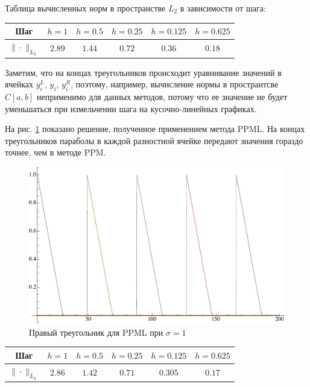 \documentclass[12pt,a4paper]{article}
\newcommand{\picref}[1]{рис. \ref{#1}}
\begin{document}
    Таблица вычисленных норм в пространстве $ L_2 $ в зависимости от шага:

    \begin{center}
        \begin{tabular}{ |c|c|c|c|c|c| } 
         \hline
         Шаг & $ h=1 $ &  $ h=0.5$ &  $ h=0.25 $ &  $ h=0.125 $ &  $ h=0.625 $ \\ 
         \hline
         $\| \cdot \|_{L_2}$ & $2.89$ & $1.44$ & $0.72$ & $0.36$ & $0.18$ \\
         \hline
        \end{tabular}
    \end{center}

    Заметим, что на концах треугольников происходит уравнивание значений в ячейках $ y_i^L,\, y_i,\, y_i^R $, поэтому, например, вычисление нормы в пространтсве $C[a,b]$ неприменимо для данных методов, потому что ее значение не будет уменьшаться при измельчении шага на кусочно-линейных графиках.

    \pagebreak

    На \picref{fig:ppml_rightTriangle_1} показано решение, полученное применением метода PPML. На концах треугольников параболы в каждой разностной ячейке передают значения гораздо точнее, чем в методе PPM.

    \begin{figure}[h]
        \centering
        \includegraphics[width=\textwidth]{sigma=1./advectionPPML_rightTriangle.pdf}
        \caption{Правый треугольник для PPML при $ \sigma = 1 $}
        \label{fig:ppml_rightTriangle_1}
    \end{figure}

    \begin{center}
        \begin{tabular}{ |c|c|c|c|c|c| } 
         \hline
         Шаг & $ h=1 $ &  $ h=0.5$ &  $ h=0.25 $ &  $ h=0.125 $ &  $ h=0.625 $ \\ 
         \hline
         $\| \cdot \|_{L_2}$ & $2.86$ & $1.42$ & $0.71$ & $0.305$ & $0.17$ \\
         \hline
        \end{tabular}
    \end{center}
\end{document}
